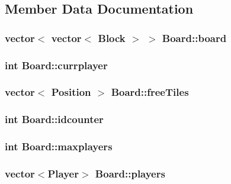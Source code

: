\subsection{Member Data Documentation}
\hypertarget{classBoard_ab2e62f1012a8a2a0fc4e564819f30e6e}{
\subsubsection[{board}]{\setlength{\rightskip}{0pt plus 5cm}vector$<$ vector$<$ {\bf Block} $>$ $>$ Board\-::board}}\label{classBoard_ab2e62f1012a8a2a0fc4e564819f30e6e}
\hypertarget{classBoard_abaa4fa9dc0aa30ff340ae3a3603bfe89}{
\subsubsection[{currplayer}]{\setlength{\rightskip}{0pt plus 5cm}int Board\-::currplayer}}\label{classBoard_abaa4fa9dc0aa30ff340ae3a3603bfe89}
\hypertarget{classBoard_a6983fbd0c0d7d6dfad304ac48c813699}{
\subsubsection[{free\-Tiles}]{\setlength{\rightskip}{0pt plus 5cm}vector$<$ {\bf Position} $>$ Board\-::free\-Tiles}}\label{classBoard_a6983fbd0c0d7d6dfad304ac48c813699}
\hypertarget{classBoard_a90bc6d3f5c2736e7ace83eff24f8ee4d}{
\subsubsection[{idcounter}]{\setlength{\rightskip}{0pt plus 5cm}int Board\-::idcounter}}\label{classBoard_a90bc6d3f5c2736e7ace83eff24f8ee4d}
\hypertarget{classBoard_a74cbb7000280715ac9ba9b71cee88d7b}{
\subsubsection[{maxplayers}]{\setlength{\rightskip}{0pt plus 5cm}int Board\-::maxplayers}}\label{classBoard_a74cbb7000280715ac9ba9b71cee88d7b}
\hypertarget{classBoard_a55e4b41d8d96b50facbcbc2996d9f1e3}{
\subsubsection[{players}]{\setlength{\rightskip}{0pt plus 5cm}vector$<${\bf Player}$>$ Board\-::players}}\label{classBoard_a55e4b41d8d96b50facbcbc2996d9f1e3}
